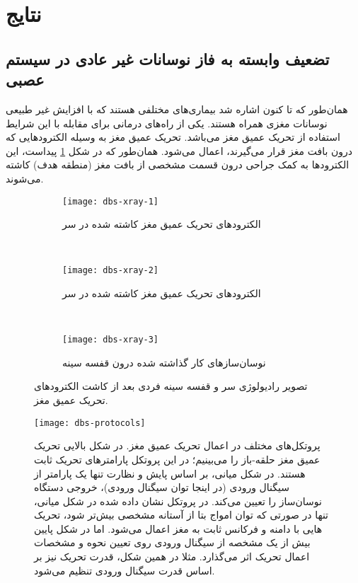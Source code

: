 \section{نتایج }
\subsection{تضعیف وابسته به فاز نوسانات غیر عادی در سیستم عصبی}
همان‌طور که تا کنون اشاره شد بیماری‌های مختلفی هستند که با افزایش غیر طبیعی نوسانات مغزی همراه هستند. 
 یکی از راه‌های درمانی برای مقابله با این شرایط استفاده از تحریک عمیق مغز می‌باشد. تحریک عمیق مغز به وسیله الکترودهایی که درون بافت مغز قرار می‌گیرند، اعمال می‌شود. همان‌طور که در شکل 
\ref{fig:dbs-xray}
پیداست، این الکترودها به کمک جراحی درون قسمت مشخصی از بافت مغز (منطقه هدف) کاشته می‌شوند. 

\begin{figure}[h]
     \centering
     \begin{subfigure}[t]{0.3\textwidth}
         \centering
         \texttt{[image: dbs-xray-1]}
         \caption{الکترودهای تحریک عمیق مغز کاشته شده در سر }
     \end{subfigure}
     \
     \begin{subfigure}[t]{0.3\textwidth}
         \centering
         \texttt{[image: dbs-xray-2]}
         \caption{الکترودهای تحریک عمیق مغز کاشته شده در سر }
     \end{subfigure}
     \
     \begin{subfigure}[t]{0.3\textwidth}
         \centering
         \texttt{[image: dbs-xray-3]}
         \caption{    نوسان‌سازهای کار گذاشته شده درون قفسه سینه}
     \end{subfigure}
        \caption{
تصویر رادیولوژی سر و قفسه سینه فردی بعد از کاشت الکترودهای تحریک عمیق مغز.
         }
        \label{fig:dbs-xray}
\end{figure}

\begin{figure}
	\centering
	\texttt{[image: dbs-protocols]}
    \caption{
    پروتکل‌های مختلف در اعمال تحریک عمیق مغز.
در شکل بالایی تحریک عمیق مغز حلقه-باز را می‌بینیم؛ در این پروتکل پارامترهای تحریک ثابت هستند. 
در شکل میانی، بر اساس پایش و نظارت تنها یک پارامتر از سیگنال ورودی (در اینجا توان سیگنال ورودی)، خروجی دستگاه نوسان‌ساز را تعیین می‌کند. در پروتکل نشان داده شده در شکل میانی، تنها در صورتی که توان امواج بتا از آستانه مشخصی بیش‌تر شود، تحریک هایی با دامنه و فرکانس ثابت به مغز اعمال می‌شود. اما در شکل پایین بیش از یک مشخصه از سیگنال ورودی روی تعیین نحوه و مشخصات اعمال تحریک اثر می‌گذارد. مثلا در همین شکل، قدرت تحریک نیز بر اساس قدرت سیگنال ورودی تنظیم می‌شود.
    }
    \label{fig:dbs-protocols}
\end{figure}


